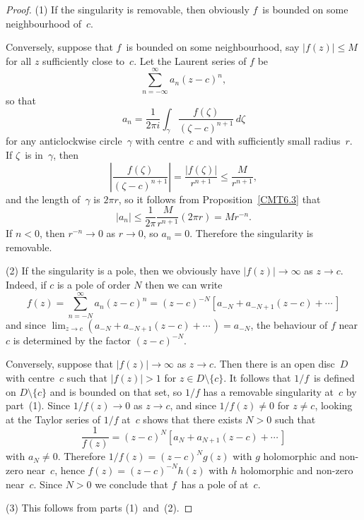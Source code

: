 \documentclass{amsproc}
\theoremstyle{definition}
\theoremstyle{remark}
\numberwithin{equation}{section}
\begin{document}
\begin{proof}
(1) If the singularity is removable, then obviously $f$~is bounded on some neighbourhood of~$c$.

Conversely, suppose that $ f $~is bounded on some neighbourhood, say $ |f(z)| \leq M $ for all $ z $ sufficiently close to~$ c $. Let the Laurent series of $ f $ be
$$
\sum_{n = -\infty}^\infty a_n(z - c)^n,
$$
so that
$$
a_n = \dfrac{1}{2\pi i} \int_\gamma \dfrac{f(\zeta)}{(\zeta - c)^{n + 1}}\,d\zeta
$$
for any anticlockwise circle~$ \gamma $ with centre~$ c $ and with sufficiently small radius~$ r $. If $ \zeta $~is in~$ \gamma $, then
$$
\left|\dfrac{f(\zeta)}{(\zeta - c)^{n + 1}}\right| = \dfrac{|f(\zeta)|}{r^{n + 1}} \leq \dfrac{M}{r^{n + 1}},
$$
and the length of~$ \gamma $ is $ 2\pi r $, so it follows from Proposition~\ref{CMT6.3} that
$$
|a_n| \leq \dfrac{1}{2\pi} \dfrac{M}{r^{n + 1}}(2\pi r) = Mr^{-n}.
$$
If $ n < 0 $, then $ r^{-n} \to 0 $ as $ r \to 0 $, so $ a_n = 0 $. Therefore the singularity is removable.

(2) If the singularity is a pole, then we obviously have $ |f(z)| \to \infty $ as $ z \to c $. Indeed, if $ c $ is a pole of order $ N $ then
we can write
$$
f(z) = \sum_{n = -N}^\infty a_n(z - c)^n = (z - c)^{-N}[a_{-N} + a_{-N + 1}(z - c) + \cdots\,]
$$
and since $ \lim_{z \to c} (a_{-N} + a_{-N + 1}(z - c) + \cdots\,) = a_{-N} $, the behaviour of $ f $ near $ c $ is determined by the factor $ (z - c)^{-N} $.

Conversely, suppose that $ |f(z)| \to \infty $ as $ z \to c $. Then there is an open disc~$ D $ with centre~$ c $ such that $ |f(z)| > 1 $ for $ z \in D \setminus\{c\} $. It
follows that $ 1/f $~is defined on $ D \setminus\{c\} $ and is bounded on that set, so $ 1/f $ has a removable singularity at~$ c $ by part~(1). Since $ 1/f(z) \to 0 $ as $ z \to c $,
and since $ 1/f(z) \neq 0 $ for $ z \neq c $, looking at the Taylor series of $ 1/f $ at~$ c $ shows that there exists $ N > 0 $ such that
$$
\dfrac{1}{f(z)} = (z - c)^N[a_N + a_{N + 1}(z - c) + \cdots\,]
$$
with $ a_N \neq 0 $. Therefore $ 1/f(z) = (z - c)^N g(z) $ with $ g $ holomorphic and non-zero near~$ c $, hence $ f(z) = (z - c)^{-N} h(z) $ with $ h $ holomorphic
and non-zero near~$ c $. Since $ N > 0 $ we conclude that $ f $~has a pole of at~$ c $.

(3) This follows from parts (1)~and~(2).
\end{proof}

\vfill\pagebreak
\end{document}
